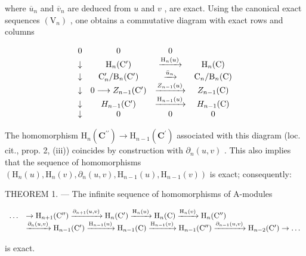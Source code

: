 where \(\overline{u}_{n}\) and \(\overline{v}_{n}\) are deduced from \(u\) and \(v\) , are exact. Using the canonical exact sequences \((\mathrm{V}_{n})\) , one obtains a commutative diagram with exact rows and columns

\[
\begin{array}{c c c c} 0 & 0 & 0 \\ \downarrow & \mathrm{H} _ {n} (\mathrm{C} ^ {\prime}) & \xrightarrow {\mathrm{H} _ {n} (u)} & \mathrm{H} _ {n} (\mathrm{C}) \\ \downarrow & \mathrm{C} _ {n} ^ {\prime} / \mathrm{B} _ {n} (\mathrm{C} ^ {\prime}) & \xrightarrow {\bar {u} _ {n}} & \mathrm{C} _ {n} / \mathrm{B} _ {n} (\mathrm{C}) \\ \downarrow & 0 \longrightarrow Z _ {n - 1} (\mathrm{C} ^ {\prime}) & \xrightarrow {Z _ {n - 1} (u)} & Z _ {n - 1} (\mathrm{C}) \\ \downarrow & H _ {n - 1} (\mathrm{C} ^ {\prime}) & \xrightarrow {\mathrm{H} _ {n - 1} (u)} & H _ {n - 1} (\mathrm{C}) \\ \downarrow & 0 & 0 & 0 \end{array}
\]

The homomorphism \(\mathrm{H}_{n}(\mathbf{C}^{\prime \prime})\to \mathrm{H}_{n - 1}(\mathbf{C}^{\prime})\) associated with this diagram (loc. cit., prop. 2, (iii)) coincides by construction with \(\partial_n(u,v)\) . This also implies that the sequence of homomorphisms \((\mathrm{H}_n(u),\mathrm{H}_n(v),\partial_n(u,v),\mathrm{H}_{n - 1}(u),\mathrm{H}_{n - 1}(v))\) is exact; consequently:

THEOREM 1. --- The infinite sequence of homomorphisms of A-modules

\[
\begin{array}{r l} \dots & \to \mathrm{H} _ {n + 1} (\mathrm{C} ^ {\prime \prime}) \xrightarrow {\partial_ {n + 1} (u , v)} \mathrm{H} _ {n} (\mathrm{C} ^ {\prime}) \xrightarrow {\mathrm{H} _ {n} (u)} \mathrm{H} _ {n} (\mathrm{C}) \xrightarrow {\mathrm{H} _ {n} (v)} \mathrm{H} _ {n} (\mathrm{C} ^ {\prime \prime}) \\ & \xrightarrow {\partial_ {n} (u , v)} \mathrm{H} _ {n - 1} (\mathrm{C} ^ {\prime}) \xrightarrow {\mathrm{H} _ {n - 1} (u)} \mathrm{H} _ {n - 1} (\mathrm{C}) \xrightarrow {\mathrm{H} _ {n - 1} (v)} \mathrm{H} _ {n - 1} (\mathrm{C} ^ {\prime \prime}) \xrightarrow {\partial_ {n - 1} (u , v)} \mathrm{H} _ {n - 2} (\mathrm{C} ^ {\prime}) \to \dots \end{array}
\]

is exact.

